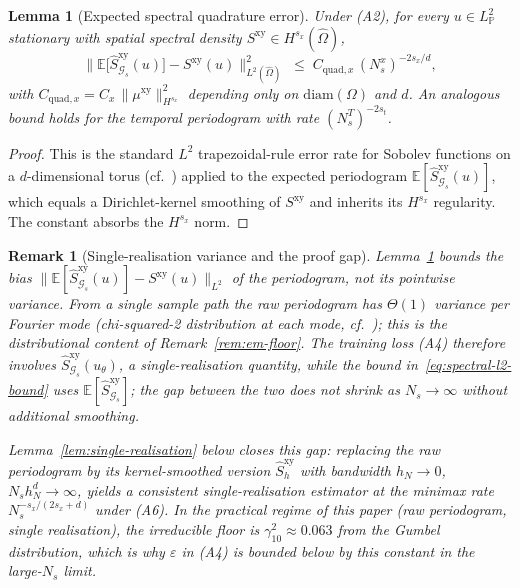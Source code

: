 \documentclass[review,12pt]{elsarticle}
\newtheorem{remark}{Remark}
\newtheorem{lemma}{Lemma}
\begin{document}
\begin{lemma}[Expected spectral quadrature error]
\label{lem:quadrature}
Under (A2), for every \(u \in L^2_{\mathbb P}\) stationary with
spatial spectral density
\(S^{\mathrm{xy}} \in H^{s_x}(\widehat\Omega)\),
\[
\bigl\|\mathbb E\bigl[\widehat S^{\mathrm{xy}}_{\mathcal G_s}(u)\bigr]
- S^{\mathrm{xy}}(u)\bigr\|^2_{L^2(\widehat\Omega)}
\;\le\; C_{\mathrm{quad},x}\,(N_s^x)^{-2s_x/d},
\]
with \(C_{\mathrm{quad},x} = C_x\,\|\mu^{\mathrm{xy}}\|^2_{H^{s_x}}\)
depending only on \(\mathrm{diam}(\Omega)\) and \(d\). An analogous
bound holds for the temporal periodogram with rate \((N_s^T)^{-2s_t}\).
\end{lemma}
\begin{proof}
This is the standard \(L^2\) trapezoidal-rule error rate for
Sobolev functions on a \(d\)-dimensional torus
(cf.~\cite[Sec.~6.5]{Trefethen2000}) applied to the expected
periodogram \(\mathbb E[\widehat S^{\mathrm{xy}}_{\mathcal G_s}(u)]\),
which equals a Dirichlet-kernel smoothing of \(S^{\mathrm{xy}}\) and
inherits its \(H^{s_x}\) regularity. The constant absorbs the
\(H^{s_x}\) norm.
\end{proof}

\begin{remark}[Single-realisation variance and the proof gap]
\label{rem:periodogram-variance}
Lemma~\ref{lem:quadrature} bounds the \emph{bias}
\(\|\mathbb E[\widehat S^{\mathrm{xy}}_{\mathcal G_s}(u)]
- S^{\mathrm{xy}}(u)\|_{L^2}\) of the periodogram, not its
pointwise variance. From a single sample path the raw periodogram
has \(\Theta(1)\) variance per Fourier mode (chi-squared-2
distribution at each mode, cf.~\cite[Ch.~4]{Brillinger1981}); this
is the distributional content of Remark~\ref{rem:em-floor}. The
training loss (A4) therefore involves
\(\widehat S^{\mathrm{xy}}_{\mathcal G_s}(u_\theta)\), a
single-realisation quantity, while the bound
in~\eqref{eq:spectral-l2-bound} uses
\(\mathbb E[\widehat S^{\mathrm{xy}}_{\mathcal G_s}]\); the gap
between the two does not shrink as \(N_s \to \infty\) without
additional smoothing.

Lemma~\ref{lem:single-realisation} below closes this gap: replacing
the raw periodogram by its kernel-smoothed version
\(\widehat S^{\mathrm{xy}}_h\) with bandwidth \(h_N \to 0\),
\(N_s h_N^d \to \infty\), yields a consistent single-realisation
estimator at the minimax rate \(N_s^{-s_x/(2s_x+d)}\) under (A6).
In the practical regime of this paper (raw periodogram, single
realisation), the irreducible floor is \(\gamma_{10}^2 \approx
0.063\) from the Gumbel distribution, which is why \(\varepsilon\)
in (A4) is bounded below by this constant in the large-\(N_s\) limit.
\end{remark}
\end{document}
